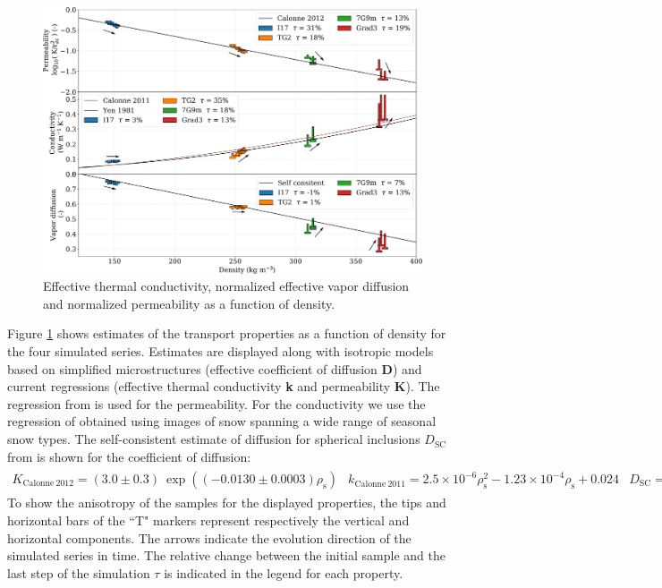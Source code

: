\documentclass[draft,ms]{agujournal2019}
\begin{document}
\begin{figure}
    \centering
    \includegraphics[width=\linewidth]{Figures/tplot_all_arrows.pdf}
    \caption{Effective thermal conductivity, normalized effective vapor diffusion and normalized permeability as a function of density.}
    \label{fig:Tplot}
\end{figure}

Figure \ref{fig:Tplot} shows estimates of the transport properties as a function of density for the four simulated series. Estimates are displayed along with isotropic models based on simplified microstructures (effective coefficient of diffusion \textbf{D}) and current regressions (effective thermal conductivity \textbf{k} and permeability \textbf{K}). The regression from  is used for the permeability. For the conductivity we use the regression of  obtained using images of snow spanning a wide range of seasonal snow types. The self-consistent estimate of diffusion for spherical inclusions $D_{\mathrm{SC}}$ from  is shown for the coefficient of diffusion: \\
\begin{subequations}
\begin{align}
K_{\mathrm{Calonne\ 2012}}=(3.0 \pm 0.3)\ \exp \left(\left(-0.0130 \pm 0.0003\right) \rho_{\mathrm{s}}\right)
\end{align}
\begin{align}
k_{\mathrm{Calonne\ 2011}}=2.5 \times 10^{-6} \rho_{\mathrm{s}}^{2}-1.23 \times 10^{-4} \rho_{\mathrm{s}}+0.024\end{align}
\begin{align}
D_{\mathrm{SC}} = 1 - \frac{3\rho_s}{2\rho_i}
\end{align}
\end{subequations}
%
 To show the anisotropy of the samples for the displayed properties, the tips and horizontal bars of the ``T" markers represent respectively the vertical and horizontal components. The arrows indicate the evolution direction of the simulated series in time. The relative change between the initial sample and the last step of the simulation $\tau$ is indicated in the legend for each property.
\end{document}
